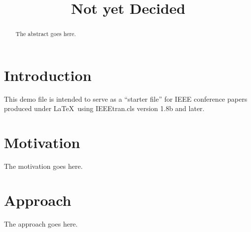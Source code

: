 \documentclass[conference]{IEEEtran}
\begin{document}
\title{Not yet Decided}

\author{
}

\maketitle


\begin{abstract}
The abstract goes here.\\
\end{abstract}


\section{Introduction}
This demo file is intended to serve as a ``starter file''
for IEEE conference papers produced under \LaTeX\ using
IEEEtran.cls version 1.8b and later.



\section{Motivation}
The motivation goes here.

\section{Approach}
The approach goes here.
\end{document}
